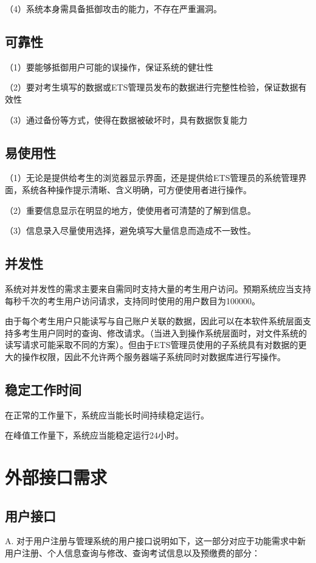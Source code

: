 （4）系统本身需具备抵御攻击的能力，不存在严重漏洞。

\subsection{可靠性}
（1）要能够抵御用户可能的误操作，保证系统的健壮性

（2）要对考生填写的数据或ETS管理员发布的数据进行完整性检验，保证数据有效性

（3）通过备份等方式，使得在数据被破坏时，具有数据恢复能力

\subsection{易使用性}
（1）无论是提供给考生的浏览器显示界面，还是提供给ETS管理员的系统管理界面，系统各种操作提示清晰、含义明确，可方便使用者进行操作。

（2）重要信息显示在明显的地方，使使用者可清楚的了解到信息。

（3）信息录入尽量使用选择，避免填写大量信息而造成不一致性。

\subsection{并发性}
系统对并发性的需求主要来自需同时支持大量的考生用户访问。预期系统应当支持每秒千次的考生用户访问请求，支持同时使用的用户数目为100000。

由于每个考生用户只能读写与自己账户关联的数据，因此可以在本软件系统层面支持多考生用户同时的查询、修改请求。（当进入到操作系统层面时，对文件系统的读写请求可能采取不同的方案）。但由于ETS管理员使用的子系统具有对数据的更大的操作权限，因此不允许两个服务器端子系统同时对数据库进行写操作。

\subsection{稳定工作时间}
在正常的工作量下，系统应当能长时间持续稳定运行。

在峰值工作量下，系统应当能稳定运行24小时。

\section{外部接口需求}

\subsection{用户接口}
A. 对于用户注册与管理系统的用户接口说明如下，这一部分对应于功能需求中新用户注册、个人信息查询与修改、查询考试信息以及预缴费的部分：

